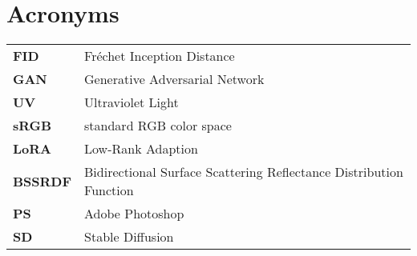 \chapter*{\centering Acronyms}
\begin{spacing}{1.5}
\setlength{\parskip}{0.3in}

\begin{table}[ht]
\centering
\begin{tabular}{ll}
\textbf{FID} & Fréchet Inception Distance \\
\textbf{GAN} & Generative Adversarial Network \\
\textbf{UV} & Ultraviolet Light \\
\textbf{sRGB} & standard RGB color space \\
\textbf{LoRA} & Low-Rank Adaption \\
\textbf{BSSRDF} & Bidirectional Surface Scattering Reflectance Distribution Function \\
\textbf{PS} & Adobe Photoshop \\
\textbf{SD} & Stable Diffusion \\
\end{tabular}%
\end{table}

\end{spacing}
\newpage
